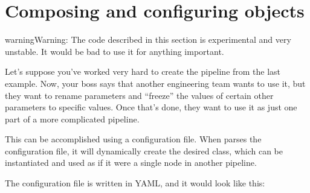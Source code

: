 \documentclass[letterpaper,10pt,english]{sphinxmanual}
\begin{document}
%
\begin{sphinxVerbatim}[commandchars=\\\{\}]
 
     
         

     
             
             
             
\end{sphinxVerbatim}


\section{Composing and configuring  objects}
\label{\detokenize{overview:composing-and-configuring-nanonode-objects}}
\begin{sphinxadmonition}{warning}{Warning:}
The code described in this section is experimental and very
unstable. It would be bad to use it for anything important.
\end{sphinxadmonition}

Let’s suppose you’ve worked very hard to create the pipeline from the
last example. Now, your boss says that another engineering team wants to
use it, but they want to rename parameters and “freeze” the values of
certain other parameters to specific values. Once that’s done, they want
to use it as just one part of a more complicated 
pipeline.

This can be accomplished using a configuration file. When 
parses the configuration file, it will dynamically create the desired
class, which can be instantiated and used as if it were a single node in
another pipeline.

The configuration file is written in YAML, and it would look like this:
\end{document}
